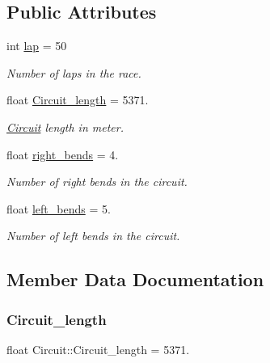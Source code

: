 \subsection*{Public Attributes}
\begin{DoxyCompactItemize}
\item 
int \hyperlink{class_circuit_a6bdf0f1b4883feb6d010c104c336c5ef}{lap} = 50
\begin{DoxyCompactList}\small\item\em Number of laps in the race. \end{DoxyCompactList}\item 
float \hyperlink{class_circuit_ad4816f23069209f47517ea3566e43e09}{Circuit\+\_\+length} = 5371.
\begin{DoxyCompactList}\small\item\em \hyperlink{class_circuit}{Circuit} length in meter. \end{DoxyCompactList}\item 
float \hyperlink{class_circuit_a3b64033e71ea613856d1054d741f0dea}{right\+\_\+bends} = 4.
\begin{DoxyCompactList}\small\item\em Number of right bends in the circuit. \end{DoxyCompactList}\item 
float \hyperlink{class_circuit_ac5eee1d1d6ea557388881e15c311e181}{left\+\_\+bends} = 5.
\begin{DoxyCompactList}\small\item\em Number of left bends in the circuit. \end{DoxyCompactList}\end{DoxyCompactItemize}


\subsection{Member Data Documentation}
\mbox{\label{class_circuit_ad4816f23069209f47517ea3566e43e09}} 
\subsubsection{\texorpdfstring{Circuit\+\_\+length}{Circuit\_length}}
{\footnotesize\ttfamily float Circuit\+::\+Circuit\+\_\+length = 5371.}



